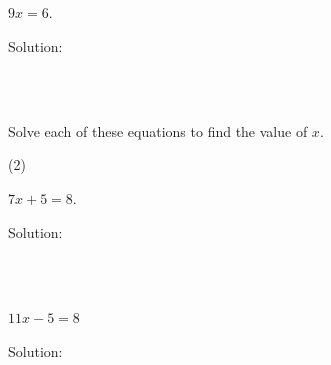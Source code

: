 \begin{mtask}
    \task \begin{exercise} $9x =6$.
             \begin{envSolution}[height=6cm]
			      Solution:
			      \begin{align*}
			           \quad\quad\quad   \\[20pt]
                       \quad\quad\quad   \\[10pt]
					   \quad\quad\quad
				 \end{align*}
                 \begin{shortsolution}  
				       $ \quad\quad$
			     \end{shortsolution}				 
               \end{envSolution}
         \end{exercise}
\end{mtask}

\clearpage\noindent
Solve each of these equations to find the value of $x$.
\begin{mtask}(2)
    \task \begin{exercise} $7x +5 =8$.
             \begin{envSolution}
			      Solution:
			      \begin{align*}
			           \quad\quad\quad                             \\[20pt]
                       \quad\quad\quad   \\[10pt]
					   \quad\quad\quad
				 \end{align*}
                 \begin{shortsolution}  
				       $ \quad\quad$
			     \end{shortsolution}				 
               \end{envSolution}
         \end{exercise}
    \task \begin{exercise} $11x - 5 =8$\\
             \begin{envSolution}
			      Solution:
			      \begin{align*}
			           \quad\quad\quad                             \\[20pt]
                       \quad\quad\quad   \\[10pt]
					   \quad\quad\quad
				 \end{align*}
                 \begin{shortsolution}  
				       $ \quad\quad$
			     \end{shortsolution}				 
               \end{envSolution}
         \end{exercise}
 \end{mtask}
 
